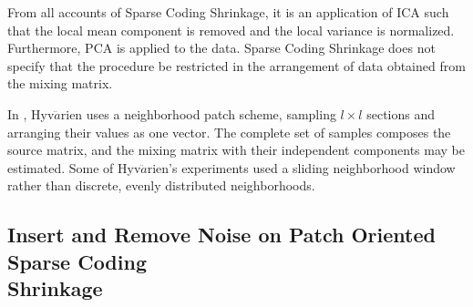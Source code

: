 \documentclass[11pt]{article}
\begin{document}
From all accounts of Sparse Coding Shrinkage, it is an application of ICA such that the local mean component is removed and the local variance is normalized.    Furthermore, PCA is applied to the data.   Sparse Coding Shrinkage does not specify that the procedure be restricted in the arrangement of data obtained from the mixing matrix.  

In \cite[391-400]{appo-ica-book}, Hyv$\ddot{a}$rien  uses a neighborhood patch scheme, sampling $l \times l$ sections and arranging their values as one vector.  The complete set of samples composes the source matrix, and the mixing matrix with their independent components may be estimated.  Some of Hyv$\ddot{a}$rien's experiments used a sliding neighborhood window rather than discrete, evenly distributed neighborhoods.  %



\subsection{Insert and Remove Noise on Patch Oriented Sparse Coding \\Shrinkage}
\end{document}
